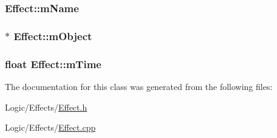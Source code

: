 \subsubsection[{\texorpdfstring{m\+Name}{mName}}]{ Effect\+::m\+Name\hspace{0.3cm}{\ttfamily [private]}}\hypertarget{classEffect_a2df4d5e229b7fa297144f74adbd83b92}{}\label{classEffect_a2df4d5e229b7fa297144f74adbd83b92}
\subsubsection[{\texorpdfstring{m\+Object}{mObject}}]{$\ast$ Effect\+::m\+Object\hspace{0.3cm}{\ttfamily [private]}}\hypertarget{classEffect_aa62e8f6d07f4f8ce745573887155bcdb}{}\label{classEffect_aa62e8f6d07f4f8ce745573887155bcdb}
\subsubsection[{\texorpdfstring{m\+Time}{mTime}}]{\setlength{\rightskip}{0pt plus 5cm}float Effect\+::m\+Time\hspace{0.3cm}{\ttfamily [private]}}\hypertarget{classEffect_a2b4ab5a6f40f7e05e5453bd188f2d39d}{}\label{classEffect_a2b4ab5a6f40f7e05e5453bd188f2d39d}


The documentation for this class was generated from the following files\+:\begin{DoxyCompactItemize}
\item 
Logic/\+Effects/\hyperlink{Effect_8h}{Effect.\+h}\item 
Logic/\+Effects/\hyperlink{Effect_8cpp}{Effect.\+cpp}\end{DoxyCompactItemize}
